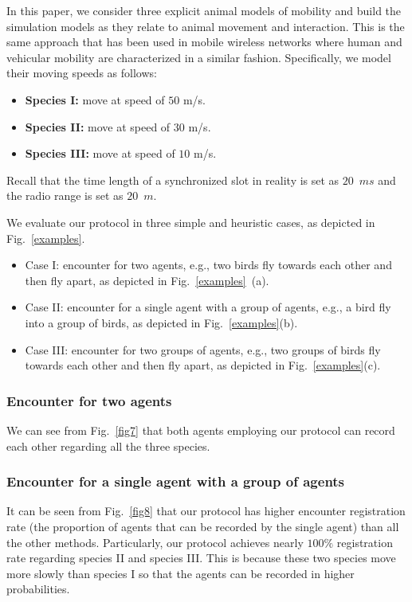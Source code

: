 In this paper, we consider three explicit animal models of mobility
and build the simulation models as they relate to animal movement and interaction. 
This is the same approach that has been used in mobile wireless networks where 
human and vehicular mobility are characterized in a similar fashion.
Specifically, we model their moving speeds as follows:
\begin{itemize}
    \item \textbf{Species I:} move at speed of $50$ m/s. 
    \item \textbf{Species II:} move at speed of $30$ m/s. 
    \item \textbf{Species III:} move at speed of $10$ m/s. 
\end{itemize}
Recall that the time length of a synchronized slot in reality 
is set as $20$~$ms$ and the radio range is set as $20$~$m$.

We evaluate our protocol in three simple and heuristic cases, as depicted in Fig.~\ref{examples}.
\begin{itemize}
    \item Case I: encounter for two agents, 
    e.g., two birds fly towards each other and then 
    fly apart, as depicted in Fig.~\ref{examples}~(a). 
    \item Case II: encounter for a single 
    agent with a group of agents, e.g., a bird fly into 
    a group of birds, as depicted in Fig.~\ref{examples}(b).
    \item Case III: encounter for two groups of agents, 
    e.g., two groups of birds fly towards each other and then fly 
    apart, as depicted in Fig.~\ref{examples}(c).
\end{itemize}

\subsubsection{Encounter for two agents}

We can see from Fig.~\ref{fig7} that both
agents employing our protocol can record each
other regarding all the three species.

\subsubsection{Encounter for a single 
agent with a group of agents}

It can be seen from Fig.~\ref{fig8} that 
our protocol has higher encounter
registration rate (the proportion of agents that can 
be recorded by the single agent) than all the other methods.
Particularly, our protocol achieves nearly $100\%$ registration
rate regarding species II and species III.
This is because these two species move more slowly than species I 
so that the agents can be recorded in higher probabilities. 

